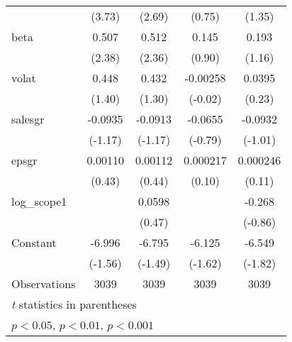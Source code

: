 \begin{table}[htbp]
\begin{tabular}{l*{4}{c}}
                    &      (3.73)         &      (2.69)         &      (0.75)         &      (1.35)         \\
[1em]
beta                &       0.507\sym{*}  &       0.512\sym{*}  &       0.145         &       0.193         \\
                    &      (2.38)         &      (2.36)         &      (0.90)         &      (1.16)         \\
[1em]
volat               &       0.448         &       0.432         &    -0.00258         &      0.0395         \\
                    &      (1.40)         &      (1.30)         &     (-0.02)         &      (0.23)         \\
[1em]
salesgr             &     -0.0935         &     -0.0913         &     -0.0655         &     -0.0932         \\
                    &     (-1.17)         &     (-1.17)         &     (-0.79)         &     (-1.01)         \\
[1em]
epsgr               &     0.00110         &     0.00112         &    0.000217         &    0.000246         \\
                    &      (0.43)         &      (0.44)         &      (0.10)         &      (0.11)         \\
[1em]
log\_scope1          &                     &      0.0598         &                     &      -0.268         \\
                    &                     &      (0.47)         &                     &     (-0.86)         \\
[1em]
Constant            &      -6.996         &      -6.795         &      -6.125         &      -6.549         \\
                    &     (-1.56)         &     (-1.49)         &     (-1.62)         &     (-1.82)         \\
\hline
Observations        &        3039         &        3039         &        3039         &        3039         \\
\hline\hline
\multicolumn{5}{l}{\footnotesize \textit{t} statistics in parentheses}\\
\multicolumn{5}{l}{\footnotesize \sym{*} \(p<0.05\), \sym{**} \(p<0.01\), \sym{***} \(p<0.001\)}\\
\end{tabular}
\end{table}
